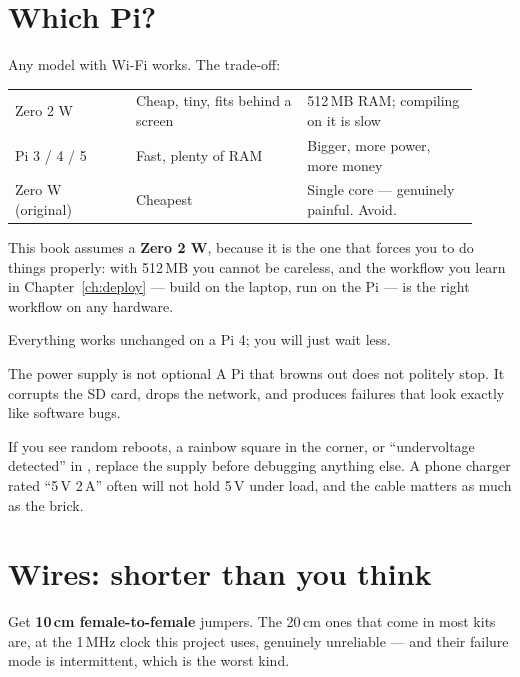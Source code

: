 \section{Which Pi?}

Any model with Wi-Fi works. The trade-off:

\begin{center}\small
\begin{tabular}{@{}L{0.24\linewidth}L{0.34\linewidth}L{0.34\linewidth}@{}}
\toprule
{} &  &  \\
\midrule
Zero 2 W & Cheap, tiny, fits behind a screen & 512\,MB RAM; compiling on it is slow \\
Pi 3 / 4 / 5 & Fast, plenty of RAM & Bigger, more power, more money \\
Zero W (original) & Cheapest & Single core --- genuinely painful. Avoid. \\
\bottomrule
\end{tabular}
\end{center}

This book assumes a \textbf{Zero 2 W}, because it is the one that forces you to
do things properly: with 512\,MB you cannot be careless, and the workflow you
learn in Chapter~\ref{ch:deploy} --- build on the laptop, run on the Pi ---
is the right workflow on any hardware.

Everything works unchanged on a Pi 4; you will just wait less.

\begin{trap}{The power supply is not optional}
A Pi that browns out does not politely stop. It corrupts the SD card, drops the
network, and produces failures that look exactly like software bugs.

If you see random reboots, a rainbow square in the corner, or ``undervoltage
detected'' in , replace the supply before debugging anything else. A
phone charger rated ``5\,V 2\,A'' often will not hold 5\,V under load, and the
cable matters as much as the brick.
\end{trap}

\section{Wires: shorter than you think}

Get \textbf{10\,cm female-to-female} jumpers. The 20\,cm ones that come in most
kits are, at the 1\,MHz clock this project uses, genuinely unreliable --- and
their failure mode is intermittent, which is the worst kind.

